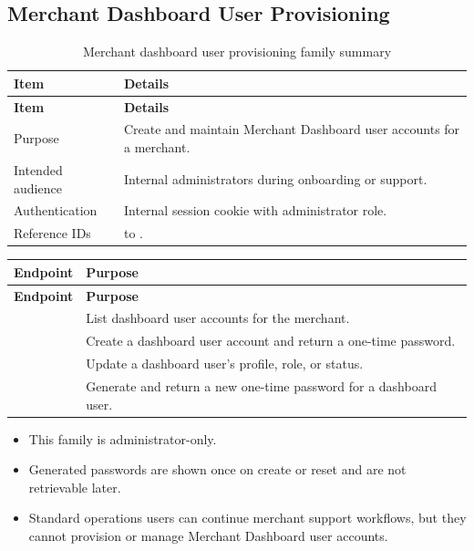 \subsection{Merchant Dashboard User Provisioning}

\begin{longtable}{@{}L{0.25\textwidth}L{0.65\textwidth}@{}}
\caption{Merchant dashboard user provisioning family summary}\\
\toprule
\textbf{Item} & \textbf{Details} \\
\midrule
\endfirsthead
\toprule
\textbf{Item} & \textbf{Details} \\
\midrule
\endhead
Purpose & Create and maintain Merchant Dashboard user accounts for a merchant. \\
\bodyrowrule
Intended audience & Internal administrators during onboarding or support. \\
\bodyrowrule
Authentication & Internal session cookie with administrator role. \\
\bodyrowrule
Reference IDs &  to . \\
\bottomrule
\end{longtable}

\begin{longtable}{@{}L{0.34\textwidth}L{0.56\textwidth}@{}}
\toprule
\textbf{Endpoint} & \textbf{Purpose} \\
\midrule
\endfirsthead
\toprule
\textbf{Endpoint} & \textbf{Purpose} \\
\midrule
\endhead
{} & List dashboard user
accounts for the merchant. \\
\bodyrowrule
{} & Create a dashboard
user account and return a one-time password. \\
\bodyrowrule
{} & Update a
dashboard user's profile, role, or status. \\
\bodyrowrule
{}
& Generate and return a new one-time password for a dashboard user. \\
\bottomrule
\end{longtable}

\begin{itemize}
  \item This family is administrator-only.
  \item Generated passwords are shown once on create or reset and are not
  retrievable later.
  \item Standard operations users can continue merchant support workflows, but
  they cannot provision or manage Merchant Dashboard user accounts.
\end{itemize}

